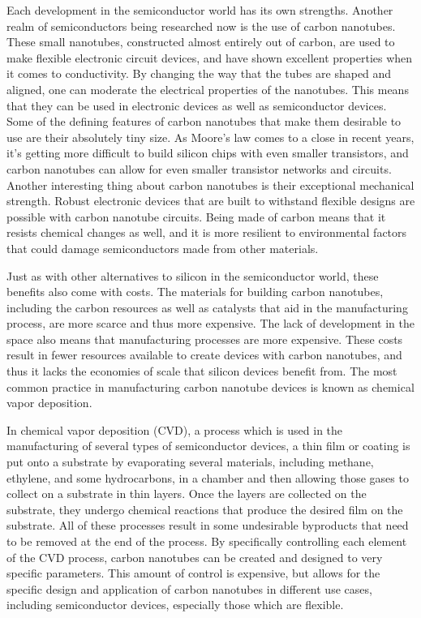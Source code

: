 \documentclass[12pt]{article}
\begin{document}
\begin{flushleft}
Each development in the semiconductor world has its
own strengths. Another realm of semiconductors being
researched now is the use of carbon nanotubes. These
small nanotubes, constructed almost entirely out of
carbon, are used to make flexible electronic circuit
devices, and have shown excellent properties when it
comes to conductivity. By changing the way that the
tubes are shaped and aligned, one can moderate the
electrical properties of the nanotubes. This means
that they can be used in electronic devices as well
as semiconductor devices. Some of the defining features
of carbon nanotubes that make them desirable to use
are their absolutely tiny size. As Moore's law comes
to a close in recent years, it's getting more difficult
to build silicon chips with even smaller transistors,
and carbon nanotubes can allow for even smaller transistor
networks and circuits. Another interesting thing about
carbon nanotubes is their exceptional mechanical strength.
Robust electronic devices that are built to withstand
flexible designs are possible with carbon nanotube
circuits. Being made of carbon means that it resists chemical
changes as well, and it is more resilient to environmental
factors that could damage semiconductors made from other 
materials.

Just as with other alternatives to silicon in the semiconductor
world, these benefits also come with costs. The materials
for building carbon nanotubes, including the carbon
resources as well as catalysts that aid in the manufacturing
process, are more scarce and thus more expensive. The
lack of development in the space also means that manufacturing
processes are more expensive. These costs result in
fewer resources available to create devices with carbon
nanotubes, and thus it lacks the economies of scale
that silicon devices benefit from. The most common
practice in manufacturing carbon nanotube devices is
known as chemical vapor deposition.

In chemical vapor deposition (CVD), a process which
is used in the manufacturing of several types of semiconductor
devices, a thin film or coating is put onto a substrate
by evaporating several materials, including methane,
ethylene, and some hydrocarbons, in a chamber and then
allowing those gases to collect on a substrate in thin
layers. Once the layers are collected on the substrate,
they undergo chemical reactions that produce the desired
film on the substrate. All of these processes result
in some undesirable byproducts that need to be removed
at the end of the process. By specifically controlling
each element of the CVD process, carbon nanotubes can
be created and designed to very specific parameters.
This amount of control is expensive, but allows for the
specific design and application of carbon nanotubes in 
different use cases, including semiconductor devices,
especially those which are flexible.


\end{flushleft}
\end{document}
